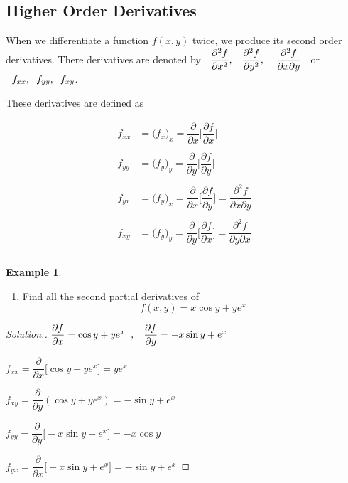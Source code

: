 \documentclass[11pt,a4paper]{article}
\theoremstyle{definition}
\newtheorem{exa}[thm]{Example}
\newenvironment{solution}
  {\renewcommand{\qedsymbol}{}\begin{proof}[\textit{Solution}.]}
  {\end{proof}}
\begin{document}
\subsection{Higher Order Derivatives}
When we differentiate a function $f(x,y)$ twice, we produce its second order derivatives. There derivatives are denoted by  $\hspace{0.2cm} \dfrac{\partial^2f}{\partial x^2},\hspace{0.3cm} \dfrac{\partial^2f}{\partial y^2}, \hspace{0.4cm} \dfrac{\partial^2f}{\partial x\partial y}\hspace{0.2cm}$ or  $\hspace{0.2cm} f_{xx},\hspace{0.2cm} f_{yy},\hspace{0.2cm} f_{xy}$.


These derivatives are defined as

\begin{align*}
f_{xx} & = \Big(f_x\Big)_x = \dfrac{\partial}{\partial x}\Bigg[\dfrac{\partial f}{\partial x}\Bigg]\\\\
f_{yy} & = \Big(f_y\Big)_y = \dfrac{\partial}{\partial y}\Bigg[\dfrac{\partial f}{\partial y}\Bigg]\\\\
f_{yx} & = \Big(f_y\Big)_x = \dfrac{\partial}{\partial x}\Bigg[\dfrac{\partial f}{\partial y}\Bigg] = \dfrac{\partial^2f}{\partial x \partial y}\\\\
f_{xy} & = \Big(f_y\Big)_y = \dfrac{\partial}{\partial y}\Bigg[\dfrac{\partial f}{\partial x}\Bigg] =  \dfrac{\partial^2f}{\partial y \partial x}\\\\
\end{align*}

\begin{exa}
\begin{enumerate}
\item Find all the second partial derivatives of $$f(x,y) = x\cos y + ye^x$$
\end{enumerate}
\end{exa}

\begin{solution}
$\dfrac{\partial f}{\partial x} = \cos y + ye^x\hspace{0.2cm}, \hspace{0.3cm} \dfrac{\partial f}{\partial y} = -x\sin y + e^x$

$f_{xx} = \dfrac{\partial}{\partial x}\big[\cos y + ye^x\big] = ye^x$

$f_{xy} = \dfrac{\partial }{\partial y}(\cos y + ye^x) = -\sin y + e^x$

$f_{yy}  = \dfrac{\partial }{\partial y}\big[-x\sin y + e^x\big] = -x\cos y$

$f_{yx} = \dfrac{\partial }{\partial x}\big[-x\sin y + e^x\big] = -\sin y + e^x$
\end{solution}
\end{document}

